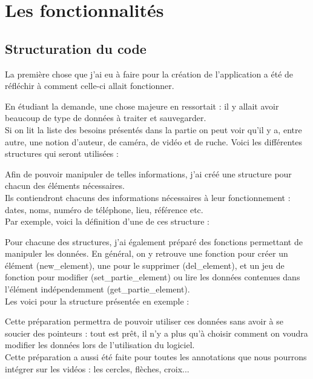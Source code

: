 \documentclass[11pt,french,a4paper]{report}
\begin{document}
    \section{Les fonctionnalités} 
        \subsection{Structuration du code}

La première chose que j'ai eu à faire pour la création de l'application a été de réfléchir à comment celle-ci allait fonctionner.

En étudiant la demande, une chose majeure en ressortait : il y allait avoir beaucoup de type de données à traiter et sauvegarder. \\
Si on lit la liste des besoins présentés dans la partie %
on peut voir qu'il y a, entre autre, une notion d'auteur, de caméra, de vidéo et de ruche. Voici les différentes structures 
qui seront utilisées : %

Afin de pouvoir manipuler de telles informations, j'ai créé une structure pour chacun des éléments nécessaires. \\
Ils contiendront chacuns des informations nécessaires à leur fonctionnement : dates, noms, numéro de téléphone, lieu, référence etc. \\

Par exemple, voici la définition d'une de ces structure : 

Pour chacune des structures, j'ai également préparé des fonctions permettant de manipuler les données.
En général, on y retrouve une fonction pour créer un élément (new\_element), une pour le supprimer (del\_element),
et un jeu de fonction pour modifier (set\_partie\_element) ou lire les données contenues dans l'élément indépendemment 
(get\_partie\_element). \\
Les voici pour la structure présentée en exemple : 


Cette préparation permettra de pouvoir utiliser ces données sans avoir à se soucier des pointeurs : tout est prêt, il n'y
a plus qu'à choisir comment on voudra modifier les données lors de l'utilisation du logiciel. \\

Cette préparation a aussi été faite pour toutes les annotations que nous pourrons intégrer sur les vidéos : 
les cercles, flèches, croix... \\
\end{document}
